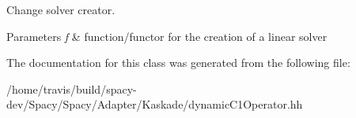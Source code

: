 \-Change solver creator. 


\begin{DoxyParams}{\-Parameters}
{\em f} & function/functor for the creation of a linear solver \\
\hline
\end{DoxyParams}


\-The documentation for this class was generated from the following file\-:\begin{DoxyCompactItemize}
\item 
/home/travis/build/spacy-\/dev/\-Spacy/\-Spacy/\-Adapter/\-Kaskade/dynamic\-C1\-Operator.\-hh\end{DoxyCompactItemize}

